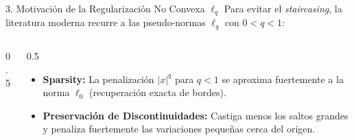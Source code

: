 \documentclass[aspectratio=169,11pt]{beamer}
\begin{document}
\begin{frame}{3. Motivación de la Regularización No Convexa $\ell_q$}
    Para evitar el \textit{staircasing}, la literatura moderna recurre a las pseudo-normas $\ell_q$ con $0 < q < 1$:
    \begin{columns}
        \begin{column}{0.5\textwidth}
            \begin{center}
            \end{center}
        \end{column}
        \begin{column}{0.5\textwidth}
            \begin{itemize}
                \item \textbf{Sparsity:} La penalización $|x|^q$ para $q < 1$ se aproxima fuertemente a la norma $\ell_0$ (recuperación exacta de bordes).
                \item \textbf{Preservación de Discontinuidades:} Castiga menos los saltos grandes y penaliza fuertemente las variaciones pequeñas cerca del origen.
            \end{itemize}
        \end{column}
    \end{columns}
\end{frame}
\end{document}

